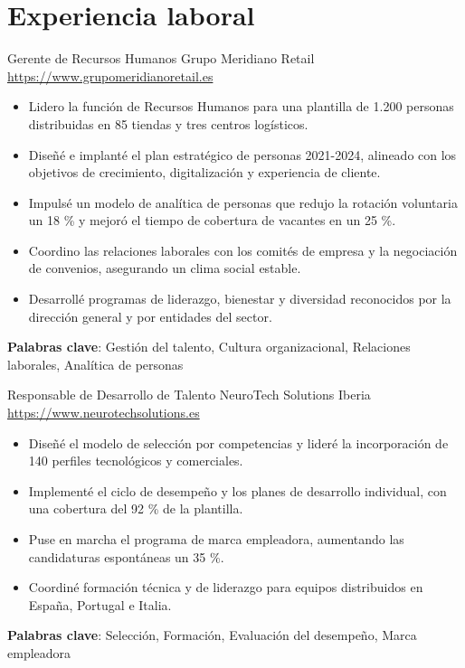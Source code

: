 \documentclass[a4paper, serif, 10pt]{moderncv}
\begin{document}
\section{Experiencia laboral}

        {Gerente de Recursos Humanos}
        {Grupo Meridiano Retail}
        {\url{https://www.grupomeridianoretail.es}}
        {}
        {\begin{itemize}
\item Lidero la función de Recursos Humanos para una plantilla de 1.200 personas distribuidas en 85 tiendas y tres centros logísticos.
\item Diseñé e implanté el plan estratégico de personas 2021-2024, alineado con los objetivos de crecimiento, digitalización y experiencia de cliente.
\item Impulsé un modelo de analítica de personas que redujo la rotación voluntaria un 18 \% y mejoró el tiempo de cobertura de vacantes en un 25 \%.
\item Coordino las relaciones laborales con los comités de empresa y la negociación de convenios, asegurando un clima social estable.
\item Desarrollé programas de liderazgo, bienestar y diversidad reconocidos por la dirección general y por entidades del sector.
\end{itemize}
\textbf{Palabras clave}: Gestión del talento, Cultura organizacional, Relaciones laborales, Analítica de personas}

        {Responsable de Desarrollo de Talento}
        {NeuroTech Solutions Iberia}
        {\url{https://www.neurotechsolutions.es}}
        {}
        {\begin{itemize}
\item Diseñé el modelo de selección por competencias y lideré la incorporación de 140 perfiles tecnológicos y comerciales.
\item Implementé el ciclo de desempeño y los planes de desarrollo individual, con una cobertura del 92 \% de la plantilla.
\item Puse en marcha el programa de marca empleadora, aumentando las candidaturas espontáneas un 35 \%.
\item Coordiné formación técnica y de liderazgo para equipos distribuidos en España, Portugal e Italia.
\end{itemize}
\textbf{Palabras clave}: Selección, Formación, Evaluación del desempeño, Marca empleadora}
\end{document}
